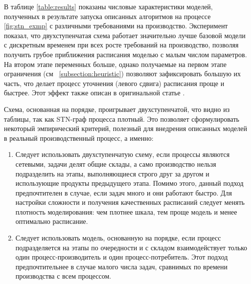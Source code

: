 \documentclass[12pt, twoside]{article}
\theoremstyle{definition}
\begin{document}
В таблице \ref{table:results} показаны числовые характеристики моделей, полученных в результате запуска описанных алгоритмов на процессе \ref{fig:stn_exmp} с различными требованиями на производство. Эксперимент показал, что двухступенчатая схема работает значительно лучше базовой модели с дискретным временем при всех росте требований на производство, позволяя получить грубое приближения расписания моделью с малым числом параметров. На втором этапе переменных больше, однако получаемые на первом этапе ограничения (см ~\ref{subsection:heuristic}) позволяют зафиксировать большую их часть, что делает процесс уточнения (левого сдвига) расписания проще и быстрее. Этот эффект также описан в оригинальной статье \cite{lpheuristics}.

Схема, основанная на порядке, проигрывает двухступенчатой, что видно из таблицы, так как STN-граф процесса плотный. Это позволяет сформулировать некоторый эмпирический критерий, полезный для внедрения описанных моделей в реальный производственный процесс, а именно:

\begin{enumerate}
	\item Следует использовать двухступенчатую схему, если процессы являются сетевыми, задачи делят общие склады, а само производство нельзя подразделить на этапы, выполняющиеся строго друг за другом и использующие продукты предыдущего этапа. Помимо этого, данный подход предпочтителен в случае, если задач много и они работают быстро. Для настройки сложности и получения качественных расписаний следует менять плотность моделирования: чем плотнее шкала, тем проще модель и менее оптимально расписание.
	\item Следует использовать модель, основанную на порядке, если процесс подразделяется на этапы по очередности и с складом взаимодействует только один процесс-производитель и один процесс-потребитель. Этот подход предпочтительнее в случае малого числа задач, сравнимых по времени производства с всем процессом.
\end{enumerate}
\end{document}

